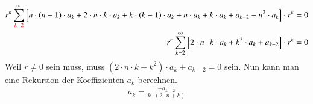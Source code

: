 \begin{refsection}
\begin{align*}
	r^n
	\sum_{\textcolor{red}{k=2}}^{\infty}
	\left[ n \cdot \left( n - 1 \right) \cdot a_k
	+
	2 \cdot n \cdot k \cdot a_k
	+
	k \cdot \left( k - 1 \right) \cdot a_k
	+
	n \cdot a_k
	+
	k \cdot a_k
	+
	a_{k-2}
	-
	n^2 \cdot a_k
	\right]
	\cdot r^k
	= 0 \\
	r^n
	\sum_{k=2}^{\infty}
	\left[
	2 \cdot n \cdot k \cdot a_k
	+
	k^2 \cdot a_k
	+
	a_{k - 2}
	\right]
	\cdot r^k
	= 0
\end{align*}
Weil $r \neq 0$ sein muss, muss $ \left( 2 \cdot n \cdot k + k^2 \right) \cdot a_k + a_{k - 2} = 0$ sein.
Nun kann man eine Rekursion der Koeffizienten $a_k$ berechnen.
\begin{align*}
	a_k
	=
	\frac
	{
		-a_{k - 2}
	}{
		k \cdot \left( 2 \cdot n + k \right)	
	}
\end{align*}


\printbibliography[heading=subbibliography]
\end{refsection}

